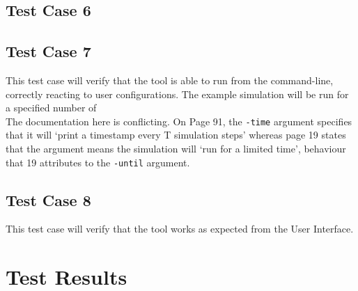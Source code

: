\documentclass[11pt]{article}
\begin{document}
\subsection{Test Case 6}
\subsection{Test Case 7}
This test case will verify that the tool is able to run from the command-line, correctly reacting to user configurations.
The example simulation will be run for a specified number of 
\\
The documentation here is conflicting. On Page 91, the \texttt{-time} argument specifies that it will `print a timestamp every T simulation steps' whereas page 19 states that the argument means the simulation will `run for a limited time', behaviour that 19 attributes to the \texttt{-until} argument.

\subsection{Test Case 8}
This test case will verify that the tool works as expected from the User Interface.

\newpage
\section{Test Results}%
\end{document}
